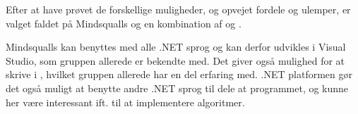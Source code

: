 Efter at have prøvet de forskellige muligheder, og opvejet fordele og ulemper, er valget faldet på Mindsqualls og en kombination af \csharp og \fsharp.


Mindsqualls kan benyttes med alle .NET sprog og kan derfor udvikles i Visual Studio, som gruppen allerede er bekendte med. 
Det giver også mulighed for at skrive i \csharp, hvilket gruppen allerede har en del erfaring med. 
.NET platformen gør det også muligt at benytte andre .NET sprog til dele at programmet, og \fsharp kunne her være interessant ift. til at implementere algoritmer.

